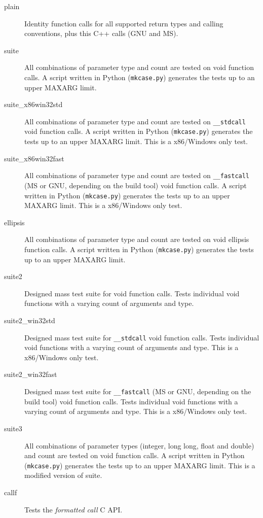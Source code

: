 \begin{description}

\item [plain] 
Identity function calls for all supported return types and calling conventions,
plus this C++ calls (GNU and MS).

\item [suite] 
All combinations of parameter type and count are tested on void function calls.
A script written in Python ({\tt mkcase.py}) generates the tests up to
an upper MAXARG limit.

\item [suite\_x86win32std] 
All combinations of parameter type and count are tested on {\tt \_\_stdcall} void function calls.
A script written in Python ({\tt mkcase.py}) generates the tests up to
an upper MAXARG limit. This is a x86/Windows only test.

\item [suite\_x86win32fast] 
All combinations of parameter type and count are tested on {\tt \_\_fastcall} (MS or GNU, depending on the build tool) void function calls.
A script written in Python ({\tt mkcase.py}) generates the tests up to
an upper MAXARG limit. This is a x86/Windows only test.

\item [ellipsis]

All combinations of parameter type and count are tested on void ellipsis 
function calls. A script written in Python ({\tt mkcase.py}) generates the 
tests up to an upper MAXARG limit.

\item [suite2]

Designed mass test suite for void function calls.
Tests individual void functions with a varying count of arguments and type.

\item [suite2\_win32std]

Designed mass test suite for {\tt \_\_stdcall} void function calls.
Tests individual void functions with a varying count of arguments and type.
This is a x86/Windows only test.

\item [suite2\_win32fast]

Designed mass test suite for {\tt \_\_fastcall} (MS or GNU, depending on the build tool) void function calls.
Tests individual void functions with a varying count of arguments and type.
This is a x86/Windows only test.

\item [suite3]

All combinations of parameter types (integer, long long, float and double) and count are tested on void function calls.
A script written in Python ({\tt mkcase.py}) generates the tests up to
an upper MAXARG limit.
This is a modified version of suite.

\item [callf]

Tests the \emph{formatted call}  C API.

\end{description}

